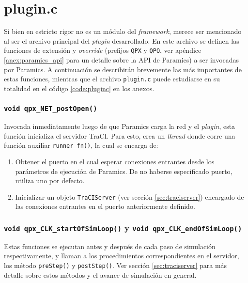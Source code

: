 \section{plugin.c}\label{sec:plugin.c}

Si bien en estricto rigor no es un módulo del \emph{framework}, merece ser mencionado al ser el archivo principal del \emph{plugin} desarrollado. En este archivo se definen las funciones de extensión y \emph{override} (prefijos \texttt{QPX} y \texttt{QPO}, ver apéndice \ref{anex:paramics_api} para un detalle sobre la API de Paramics) a ser invocadas por Paramics. A continuación se describirán brevemente las más importantes de estas funciones, mientras que el archivo \texttt{plugin.c} puede estudiarse en su totalidad en el código \ref{code:pluginc} en los anexos.

\subsubsection{\texttt{void qpx\_NET\_postOpen()}}\label{sec:qpx_postopen}

Invocada inmediatamente luego de que Paramics carga la red y el \emph{plugin}, esta función inicializa el servidor TraCI. Para esto, crea un \emph{thread} donde corre una función auxiliar \texttt{runner\_fn()}, la cual se encarga de:

\begin{enumerate}
    \item Obtener el puerto en el cual esperar conexiones entrantes desde los parámetros de ejecución de Paramics. De no haberse especificado puerto, utiliza uno por defecto.
    \item Inicializar un objeto \texttt{TraCIServer} (ver sección \ref{sec:traciserver}) encargado de las conexiones entrantes en el puerto anteriormente definido.
\end{enumerate}

\subsubsection{\texttt{void qpx\_CLK\_startOfSimLoop()} y \texttt{void qpx\_CLK\_endOfSimLoop()}}

Estas funciones se ejecutan antes y después de cada paso de simulación respectivamente, y llaman a los procedimientos correspondientes en el servidor, los método \texttt{preStep()} y \texttt{postStep()}. Ver sección \ref{sec:traciserver} para más detalle sobre estos métodos y el avance de simulación en general.

